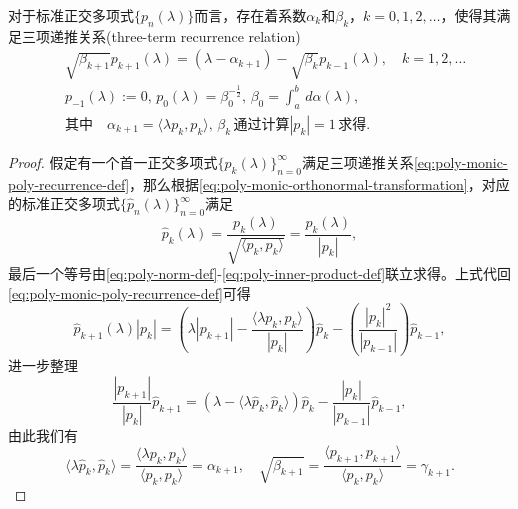 \begin{subappendices}
\begin{theorem}[标准正交多项式的三项递推关系]
  \label{theorem:poly-orthonormal-recurrence-theorem}
  对于标准正交多项式$\{p_{n} (\lambda)\}$而言，存在着系数$\alpha_k$和$\beta_{k}$，$k=0, 1,2,\ldots $，使得其满足三项递推关系(three-term recurrence relation)
  \begin{equation*}
    \begin{split}
      &\sqrt{\beta_{k+1}} p_{k+1}(\lambda) = \left( \lambda -\alpha_{k+1} \right) - \sqrt{\beta_{k}} p_{k-1}(\lambda), \quad k=1,2,\ldots\\
      &p_{-1}(\lambda) := 0, \, p_0(\lambda) = \beta_0^{-\frac{1}{2}}, \, \beta_0 = \int_a^b \, d \alpha(\lambda), \\
      &\text{其中} \quad \alpha_{k+1} = \langle \lambda p_{k}, p_{k} \rangle , \, \beta_k \, \text{通过计算} \left| p_k \right|=1 \, \text{求得}.
    \end{split}
  \end{equation*}
\end{theorem}
\begin{proof}
  假定有一个首一正交多项式$\{p_k(\lambda)\}_{n=0}^{\infty}$满足三项递推关系\eqref{eq:poly-monic-poly-recurrence-def}，那么根据\eqref{eq:poly-monic-orthonormal-transformation}，对应的标准正交多项式$\{\hat{p}_n(\lambda)\}_{n=0}^{\infty}$满足
  \begin{equation*}
    \hat{p}_k(\lambda)=\frac{p_{k}(\lambda)}{\sqrt{\langle p_k,p_k \rangle}} = \frac{p_{k}(\lambda)}{\left| p_k \right|},
  \end{equation*}
  最后一个等号由\eqref{eq:poly-norm-def}-\eqref{eq:poly-inner-product-def}联立求得。上式代回\eqref{eq:poly-monic-poly-recurrence-def}可得
  \begin{equation*}
    \hat{p}_{k+1}(\lambda) \left| p_{k} \right|
    = \left(
    \lambda \left| p_{k+1} \right| - \frac{
    \langle \lambda p_k, p_k \rangle
    }{
    \left| p_k \right|
    }
    \right) \hat{p}_{k}
    - \left( \frac{\left| p_k \right| ^2}{\left| p_{k-1} \right|} \right)  \hat{p}_{k-1},
  \end{equation*}
  进一步整理
  \begin{equation*}
    \frac{\left| p_{k+1} \right|}{\left| p_k \right|} \hat{p}_{k+1} = \left( \lambda - \langle \lambda \hat{p}_k, \hat{p}_{k} \rangle \right) \hat{p}_k
    - \frac{\left| p_k \right|}{\left| p_{k-1} \right|} \hat{p}_{k-1},
  \end{equation*}
  由此我们有
  \begin{equation*}
    \langle \lambda \hat{p}_k, \hat{p}_k \rangle = \frac{
    \langle \lambda p_k, p_k \rangle
    }{\langle p_k, p_k \rangle} = \alpha_{k+1}, \quad \sqrt{\beta_{k+1}} = \frac{
    \langle p_{k+1}, p_{k+1} \rangle
    }{
    \langle p_k, p_k \rangle
    } = \gamma_{k+1}.
  \end{equation*}


\end{proof}
\end{subappendices}
